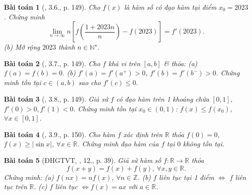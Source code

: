 \documentclass{article}
\newtheorem{baitoan}{Bài toán}
\begin{document}
\begin{baitoan}[\cite{Quoc_Long_Dat_Nam_VMC}, 3.6., p. 149]
	Cho $f(x)$ là hàm số có đạo hàm tại điểm $x_0 = 2023$. Chứng minh
	\begin{equation*}
		\lim_{n\to\infty} n\left[f\left(\frac{1 + 2023n}{n}\right) - f(2023)\right] = f'(2023).
	\end{equation*}
	(b) Mở rộng $2023$ thành $n\in\mathbb{N}^\star$.
\end{baitoan}

\begin{baitoan}[\cite{Quoc_Long_Dat_Nam_VMC}, 3.7., p. 149]
	Cho $f$ khả vi trên $[a,b]$ \& thỏa: (a) $f(a) = f(b) = 0$. (b) $f'(a) = f'(a^+) > 0$, $f'(b) = f'(b^-) > 0$. Chứng minh tồn tại $c\in(a,b)$ sao cho $f'(c)\le0$.
\end{baitoan}

\begin{baitoan}[\cite{Quoc_Long_Dat_Nam_VMC}, 3.8., p. 149]
	Giả sử $f$ có đạo hàm trên 1 khoảng chứa $[0,1]$, $f'(0) > 0,f'(1) < 0$. Chứng minh tồn tại $x_0\in(0,1)$: $f(x)\le f(x_0)$, $\forall x\in[0,1]$.
\end{baitoan}

\begin{baitoan}[\cite{Quoc_Long_Dat_Nam_VMC}, 3.9., p. 150]
	Cho hàm $f$ xác định trên $\mathbb{R}$ thỏa $f(0) = 0$, $f(x)\ge|\sin x|$, $\forall x\in\mathbb{R}$. Chứng minh đạo hàm của $f$ tại $0$ không tồn tại.
\end{baitoan}

\begin{baitoan}[ĐHGTVT, \cite{VMS_VMC2025}, 12., p. 39]
	Giả sử hàm số $f:\mathbb{R}\to\mathbb{R}$ thỏa
	\begin{equation*}
		f(x + y) = f(x) + f(y),\ \forall x,y\in\mathbb{R}.
	\end{equation*}
	Chứng minh: (a) $f(nx) = nf(x)$, $\forall n\in\mathbb{Z}$. (b) $f$ liên tục tại 1 điểm $\Leftrightarrow$ $f$ liên tục trên $\mathbb{R}$. (c) $f$ liên tục $\Leftrightarrow f(x) = ax$ với $a\in\mathbb{R}$.
\end{baitoan}
\end{document}
